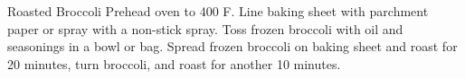 \documentclass[../cookbook.tex]{subfiles}
\begin{document}
\begin{recipe}{Roasted Broccoli}{}{}
    Prehead oven to 400 \degrees{}F. Line baking sheet with parchment paper or
    spray with a non-stick spray.
    Toss frozen broccoli with oil and seasonings in a bowl or bag. Spread
    frozen broccoli on baking sheet and roast for 20 minutes, turn broccoli, and
    roast for another 10 minutes.

\end{recipe}
\end{document}
